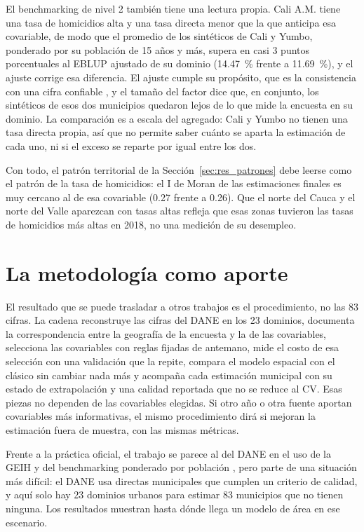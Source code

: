 El benchmarking de nivel 2 también tiene una lectura propia. Cali A.M. tiene una tasa de homicidios alta y una tasa directa menor que la que anticipa esa covariable, de modo que el promedio de los sintéticos de Cali y Yumbo, ponderado por su población de 15 años y más, supera en casi 3 puntos porcentuales al EBLUP ajustado de su dominio (14.47~\% frente a 11.69~\%), y el ajuste corrige esa diferencia. El ajuste cumple su propósito, que es la consistencia con una cifra confiable \cite[pp.~24, 76]{Molina2019}, y el tamaño del factor dice que, en conjunto, los sintéticos de esos dos municipios quedaron lejos de lo que mide la encuesta en su dominio. La comparación es a escala del agregado: Cali y Yumbo no tienen una tasa directa propia, así que no permite saber cuánto se aparta la estimación de cada uno, ni si el exceso se reparte por igual entre los dos.

Con todo, el patrón territorial de la Sección~\ref{sec:res_patrones} debe leerse como el patrón de la tasa de homicidios: el I de Moran de las estimaciones finales es muy cercano al de esa covariable (0.27 frente a 0.26). Que el norte del Cauca y el norte del Valle aparezcan con tasas altas refleja que esas zonas tuvieron las tasas de homicidios más altas en 2018, no una medición de su desempleo.

\section{La metodología como aporte}
\label{sec:dis_metodologia}

El resultado que se puede trasladar a otros trabajos es el procedimiento, no las 83 cifras. La cadena reconstruye las cifras del DANE en los 23 dominios, documenta la correspondencia entre la geografía de la encuesta y la de las covariables, selecciona las covariables con reglas fijadas de antemano, mide el costo de esa selección con una validación que la repite, compara el modelo espacial con el clásico sin cambiar nada más y acompaña cada estimación municipal con su estado de extrapolación y una calidad reportada que no se reduce al CV. Esas piezas no dependen de las covariables elegidas. Si otro año o otra fuente aportan covariables más informativas, el mismo procedimiento dirá si mejoran la estimación fuera de muestra, con las mismas métricas.

Frente a la práctica oficial, el trabajo se parece al del DANE en el uso de la GEIH y del benchmarking ponderado por población \cite[pp.~21--22, 25]{DANE_SAE_2025}, pero parte de una situación más difícil: el DANE usa directas municipales que cumplen un criterio de calidad, y aquí solo hay 23 dominios urbanos para estimar 83 municipios que no tienen ninguna. Los resultados muestran hasta dónde llega un modelo de área en ese escenario.

